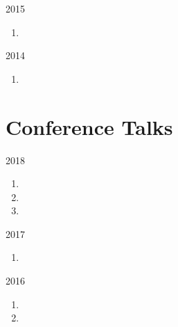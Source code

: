 \begin{paracol}{2}
  \textsc{2015}
\switchcolumn
  \begin{enumerate}
    \setcounter{enumi}{\thepubcounter}
    \item {}
    \setcounter{pubcounter}{\theenumi}
  \end{enumerate}
\end{paracol}

\begin{paracol}{2}
  \textsc{2014}
\switchcolumn
  \begin{enumerate}
    \setcounter{enumi}{\thepubcounter}
    \item {}
    \setcounter{pubcounter}{\theenumi}
  \end{enumerate}
\end{paracol}

\section*{Conference Talks}

\begin{paracol}{2}
  \textsc{2018}
\switchcolumn
  \begin{enumerate}
    \setcounter{enumi}{\thepubcounter}
    \item {}
    \item {}
    \item {}
    \setcounter{pubcounter}{\theenumi}
  \end{enumerate}
\end{paracol}

\begin{paracol}{2}
  \textsc{2017}
\switchcolumn
  \begin{enumerate}
    \setcounter{enumi}{\thepubcounter}
    \item {}
    \setcounter{pubcounter}{\theenumi}
  \end{enumerate}
\end{paracol}

\begin{paracol}{2}
  \textsc{2016}
\switchcolumn
  \begin{enumerate}
    \setcounter{enumi}{\thepubcounter}
    \item {}
    \item {}
    \setcounter{pubcounter}{\theenumi}
  \end{enumerate}
\end{paracol}

